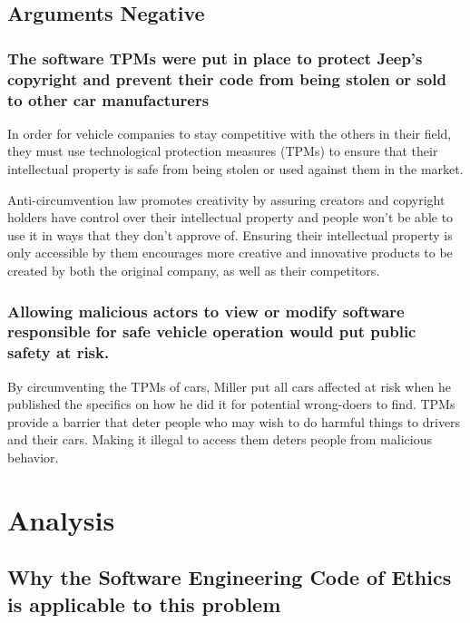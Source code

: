 \documentclass[12pt]{article}
\begin{document}
\begin{multicols}{2}
\subsection{Arguments Negative}

\subsubsection{The software TPMs were put in place to protect Jeep's copyright and prevent their code from being stolen or sold to other car manufacturers}

In order for vehicle companies to stay competitive with the others in their field, they must use technological protection measures (TPMs) to ensure that their intellectual property is safe from being stolen or used against them in the market. 

Anti-circumvention law promotes creativity by assuring creators and copyright holders have control over their intellectual property and people won't be able to use it in ways that they don't approve of.\cite{chris} Ensuring their intellectual property is only accessible by them encourages more creative and innovative products to be created by both the original company, as well as their competitors. \cite{chris}
 
\subsubsection{Allowing malicious actors to view or modify software responsible for safe vehicle operation would put public safety at risk.}

By circumventing the TPMs of cars, Miller put all cars affected at risk when he published the specifics on how he did it\cite{officialPaper} for potential wrong-doers to find.
TPMs provide a barrier that deter people who may wish to do harmful things to drivers and their cars. \cite{chris} Making it illegal to access them deters people from malicious behavior. 

\section{Analysis}

\subsection{Why the Software Engineering Code of Ethics is applicable to this problem}


\end{multicols}
\end{document}
